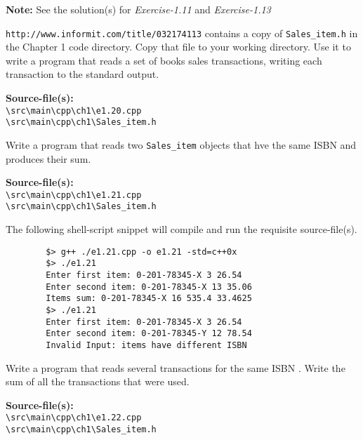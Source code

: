 \documentclass[12pt, a4paper]{article}
\begin{document}
    \noindent\textbf{Note:} See the solution(s) for \textit{Exercise-1.11} and \textit{Exercise-1.13}

    \bigskip
    \begin{tcolorbox}[title={Exercise: 1.20}]
        \texttt{http://www.informit.com/title/032174113} contains a copy of \texttt{Sales\_item.h} in the Chapter 1 code directory.
        Copy that file to your working directory.
        Use it to write a program that reads a set of books sales transactions, writing each transaction to the standard output.
    \end{tcolorbox}
    \noindent\textbf{Source-file(s):}
    \\ \texttt{\textbackslash src\textbackslash main\textbackslash cpp\textbackslash ch1\textbackslash e1.20.cpp}
    \\ \texttt{\textbackslash src\textbackslash main\textbackslash cpp\textbackslash ch1\textbackslash Sales\_item.h}

    \bigskip
    \begin{tcolorbox}[title={Exercise: 1.21}]
        Write a program that reads two \texttt{Sales\_item} objects that hve the same ISBN and produces their sum.
    \end{tcolorbox}
    \noindent\textbf{Source-file(s):}
    \\ \texttt{\textbackslash src\textbackslash main\textbackslash cpp\textbackslash ch1\textbackslash e1.21.cpp}
    \\ \texttt{\textbackslash src\textbackslash main\textbackslash cpp\textbackslash ch1\textbackslash Sales\_item.h}

    \noindent The following shell-script snippet will compile and run the requisite source-file(s).
    \begin{verbatim}
        $> g++ ./e1.21.cpp -o e1.21 -std=c++0x
        $> ./e1.21
        Enter first item: 0-201-78345-X 3 26.54
        Enter second item: 0-201-78345-X 13 35.06
        Items sum: 0-201-78345-X 16 535.4 33.4625
        $> ./e1.21
        Enter first item: 0-201-78345-X 3 26.54
        Enter second item: 0-201-78345-Y 12 78.54
        Invalid Input: items have different ISBN
    \end{verbatim}

    \bigskip
    \begin{tcolorbox}[title={Exercise: 1.22}]
        Write a program that reads several transactions for the same ISBN .
        Write the sum of all the transactions that were used.
    \end{tcolorbox}
    \noindent\textbf{Source-file(s):}
    \\ \texttt{\textbackslash src\textbackslash main\textbackslash cpp\textbackslash ch1\textbackslash e1.22.cpp}
    \\ \texttt{\textbackslash src\textbackslash main\textbackslash cpp\textbackslash ch1\textbackslash Sales\_item.h}
\end{document}
